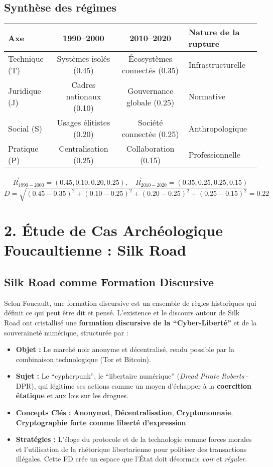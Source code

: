 \documentclass[a4paper,12pt]{report}
\begin{document}
	\subsection*{Synthèse des régimes}
	\begin{center}
		\begin{tabular}{|l|c|c|l|}
			\hline
			\textbf{Axe} & \textbf{1990--2000} & \textbf{2010--2020} & \textbf{Nature de la rupture} \\ \hline
			Technique (T) & Systèmes isolés (0.45) & Écosystèmes connectés (0.35) & Infrastructurelle \\ \hline
			Juridique (J) & Cadres nationaux (0.10) & Gouvernance globale (0.25) & Normative \\ \hline
			Social (S) & Usages élitistes (0.20) & Société connectée (0.25) & Anthropologique \\ \hline
			Pratique (P) & Centralisation (0.25) & Collaboration (0.15) & Professionnelle \\ \hline
		\end{tabular}
	\end{center}
	\[
	\vec{R}_{1990-2000} = (0.45, 0.10, 0.20, 0.25), \quad
	\vec{R}_{2010-2020} = (0.35, 0.25, 0.25, 0.15)
	\]
	\[
	D = \sqrt{(0.45-0.35)^2 + (0.10-0.25)^2 + (0.20-0.25)^2 + (0.25-0.15)^2} = 0.22
	\]
	
	
	\section*{2. Étude de Cas Archéologique Foucaultienne : Silk Road}
	\label{sec:silkroad}
	
	\subsection*{Silk Road comme Formation Discursive}
	Selon Foucault, une formation discursive est un ensemble de règles historiques qui définit ce qui peut être dit et pensé. L'existence et le discours autour de Silk Road ont cristallisé une \textbf{formation discursive de la ``Cyber-Liberté''} et de la souveraineté numérique, structurée par :
	\begin{itemize}
		\item \textbf{Objet :} Le marché noir anonyme et décentralisé, rendu possible par la combinaison technologique (Tor et Bitcoin).
		\item \textbf{Sujet :} Le ``cypherpunk'', le ``libertaire numérique'' (\textit{Dread Pirate Roberts} - DPR), qui légitime ses actions comme un moyen d'échapper à la \textbf{coercition étatique} et aux lois sur les drogues.
		\item \textbf{Concepts Clés :} \textbf{Anonymat}, \textbf{Décentralisation}, \textbf{Cryptomonnaie}, \textbf{Cryptographie forte comme liberté d'expression}.
		\item \textbf{Stratégies :} L'éloge du protocole et de la technologie comme forces morales et l'utilisation de la rhétorique libertarienne pour politiser des transactions illégales. Cette FD crée un espace que l'État doit désormais \emph{voir} et \emph{réguler}.
	\end{itemize}
	
\end{document}
